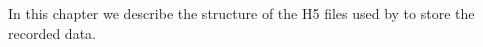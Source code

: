 In this chapter we describe the structure of the H5 files used by
\progname to store the recorded data.

